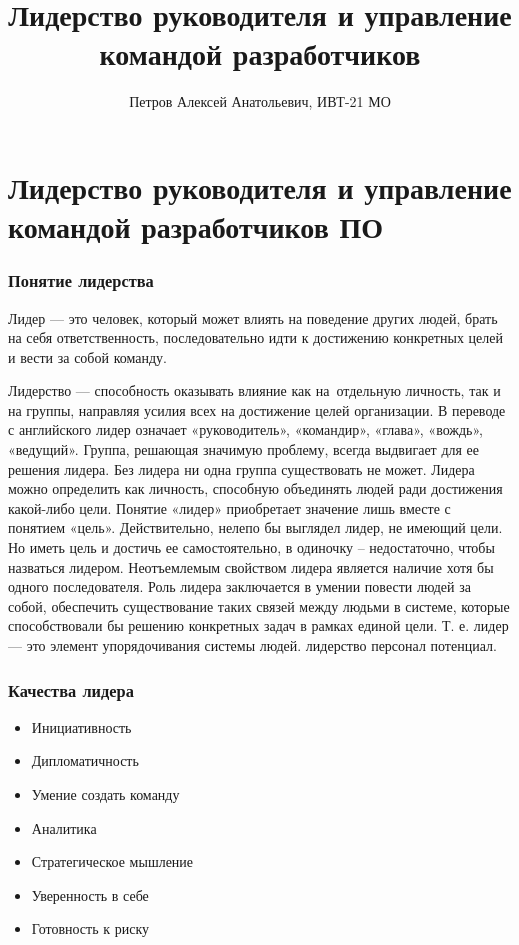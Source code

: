 \documentclass{../industrial-development}
\title{Лидерство руководителя и управление командой разработчиков}
\author{Петров Алексей Анатольевич, ИВТ-21 МО}
\date{}
\begin{document}
\begin{frame}
  \titlepage
\end{frame}

\section{Лидерство руководителя и управление командой разработчиков ПО}

\begin{frame} \frametitle{Понятие лидерства}
 Лидер --- это человек, который может влиять на поведение других людей, брать на себя ответственность, последовательно идти к достижению конкретных целей и вести за собой команду.
\end{frame}

\lecturenotes

Лидерство --- способность оказывать влияние как на~отдельную личность, так и на группы, направляя усилия всех на достижение целей организации. В переводе с английского лидер означает «руководитель», «командир», «глава», «вождь», «ведущий». Группа, решающая значимую проблему, всегда выдвигает для ее решения лидера. Без лидера ни одна группа существовать не может. Лидера можно определить как личность, способную объединять людей ради достижения какой-либо цели. Понятие «лидер» приобретает значение лишь вместе с понятием «цель». Действительно, нелепо бы выглядел лидер, не имеющий цели.
Но иметь цель и достичь ее самостоятельно, в одиночку -- недостаточно, чтобы назваться лидером. Неотъемлемым свойством лидера является наличие хотя бы одного последователя. Роль лидера заключается в умении повести людей за собой, обеспечить существование таких связей между людьми в системе, которые способствовали бы решению конкретных задач в рамках единой цели. Т. е. лидер --- это элемент упорядочивания системы людей. лидерство персонал потенциал.


\begin{frame} \frametitle{Качества лидера}
  \begin{itemize}
  \item Инициативность
  \item Дипломатичность
  \item Умение создать команду
  \item Аналитика
  \item Стратегическое мышление
  \item Уверенность в себе
  \item Готовность к риску  
  \end{itemize}
\end{frame}
\end{document}
